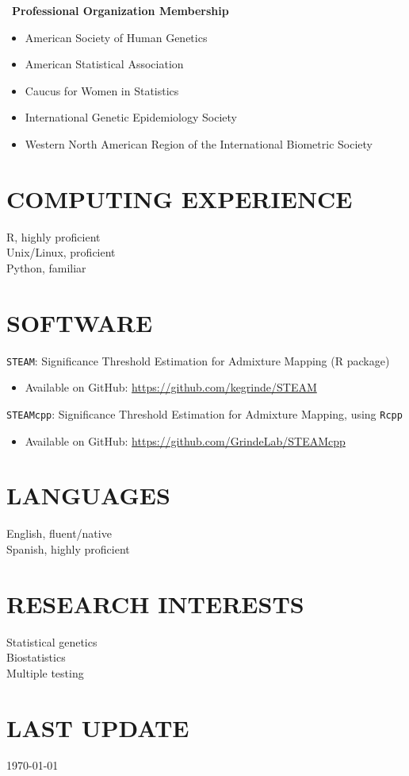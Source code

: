 \documentclass[margin]{res}
\begin{document}
\begin{resume}
	\ \textbf{Professional Organization Membership} 
	\begin{itemize}	 \itemsep -2pt
	\item American Society of Human Genetics 
	\item American Statistical Association
	\item Caucus for Women in Statistics
	\item International Genetic Epidemiology Society 
	\item Western North American Region of the International Biometric Society \\
	\end{itemize}

\section{COMPUTING EXPERIENCE} R, highly proficient \\
							Unix/Linux, proficient \\
							Python, familiar \\
							
\section{SOFTWARE} \texttt{STEAM}: Significance Threshold Estimation for Admixture Mapping (R package)
					\begin{itemize} \itemsep -2pt
					\item Available on GitHub: \href{https://github.com/kegrinde/STEAM}{https://github.com/kegrinde/STEAM} \\
					\end{itemize}
					
					\texttt{STEAMcpp}: Significance Threshold Estimation for Admixture Mapping, using \texttt{Rcpp}
					\begin{itemize} \itemsep -2pt
					\item Available on GitHub:  \href{https://github.com/GrindeLab/STEAMcpp}{https://github.com/GrindeLab/STEAMcpp} \\
					\end{itemize}

\section{LANGUAGES} English, fluent/native \\
					Spanish, highly proficient\\

\section{RESEARCH INTERESTS} Statistical genetics \\
							 Biostatistics \\
							 Multiple testing		\\
			
\section{LAST UPDATE} \today

\end{resume}
\end{document}
